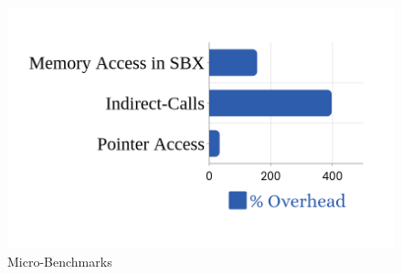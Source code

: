 \begin{figure}[h!]
\includegraphics[width=1.0\linewidth]{images/microbenchmark.png}
\caption{\systemname Micro-Benchmarks}
\label{fig:microbenchmarks}
\end{figure}



